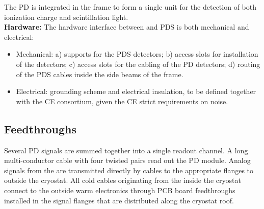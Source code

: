 


The PD is integrated in the  frame to form a single unit for the detection of both ionization charge and scintillation light.\\

\textbf{Hardware:}
The hardware interface between  and PDS is both mechanical and electrical: 
\begin{itemize}
\item Mechanical: a) supports for the PDS detectors; b) access slots for installation of the detectors;
 c) access slots for the cabling of the PD detectors; d) routing of the PDS cables inside the side beams of the  frame.
\item Electrical: grounding scheme and electrical insulation, to be defined together with the CE consortium, given the CE strict requirements on noise.
\end{itemize}


\subsection{Feedthroughs}
\label{sec:fdsp-pd-intfc-feed}

Several PD  signals are summed together into a single readout channel. A long multi-conductor cable with four twisted pairs read out the PD module. 
Analog signals from the  are transmitted directly by cables to the appropriate flanges to outside the cryostat. 
All cold cables originating from the inside the cryostat connect to the outside warm electronics through PCB board feedthroughs installed in the signal flanges that are distributed along the cryostat roof.

